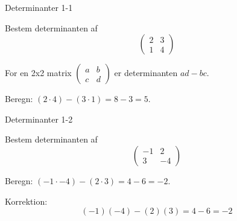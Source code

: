 \documentclass{article}
\begin{document}

\tableofcontents
\newpage

\begin{exercise}{Determinanter 1-1}

Bestem determinanten af
\[
\begin{pmatrix} 2 & 3 \\ 1 & 4 \end{pmatrix}
\]


\hint

For en 2x2 matrix $\begin{pmatrix} a & b \\ c & d \end{pmatrix}$ er determinanten $ad - bc$.

\hint

Beregn: $(2 \cdot 4) - (3 \cdot 1) = 8 - 3 = 5$.

\end{exercise}

\newpage

\begin{exercise}{Determinanter 1-2}

Bestem determinanten af
\[
\begin{pmatrix} -1 & 2 \\ 3 & -4 \end{pmatrix}
\]


\hint

Beregn: $(-1 \cdot -4) - (2 \cdot 3) = 4 - 6 = -2$.

\hint
Korrektion:
\[
(-1)(-4) - (2)(3) = 4 - 6 = -2
\]

\end{exercise}
\end{document}
